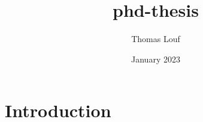 \documentclass{article}
\title{phd-thesis}
\author{Thomas Louf}
\date{January 2023}
\begin{document}
\maketitle

\section{Introduction}
\end{document}
